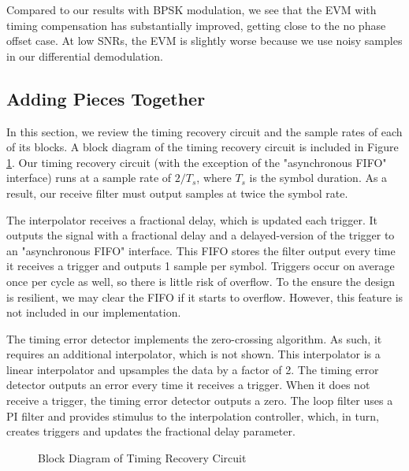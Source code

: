 \documentclass{article}
\begin{document}
\noindent Compared to our results with BPSK modulation, we see that the EVM with timing compensation has substantially improved, getting close to the no phase offset case. At low SNRs, the EVM is slightly worse because we use noisy samples in our differential demodulation.

\subsection{Adding Pieces Together}
\label{section::adding_pieces_together}

In this section, we review the timing recovery circuit and the sample rates of each of its blocks. A block diagram of the timing recovery circuit is included in Figure \ref{fig::timing_recovery_block_diagram_2}. Our timing recovery circuit (with the exception of the "asynchronous FIFO" interface) runs at a sample rate of $2/T_s$, where $T_s$ is the symbol duration. As a result, our receive filter must output samples at twice the symbol rate.

	The interpolator receives a fractional delay, which is updated each trigger. It outputs the signal with a fractional delay and a delayed-version of the trigger to an "asynchronous FIFO" interface. This FIFO stores the filter output every time it receives a trigger and outputs 1 sample per symbol. Triggers occur on average once per cycle as well, so there is little risk of overflow. To the ensure the design is resilient, we may clear the FIFO if it starts to overflow. However, this feature is not included in our implementation.
	
	The timing error detector implements the zero-crossing algorithm. As such, it requires an additional interpolator, which is not shown. This interpolator is a linear interpolator and upsamples the data by a factor of 2. The timing error detector outputs an error every time it receives a trigger. When it does not receive a trigger, the timing error detector outputs a zero. The loop filter uses a PI filter and provides stimulus to the interpolation controller, which, in turn, creates triggers and updates the fractional delay parameter.
	
\begin{figure}[H]
	\centerline{}
	\caption{Block Diagram of Timing Recovery Circuit}
	\label{fig::timing_recovery_block_diagram_2}
\end{figure}
\end{document}
